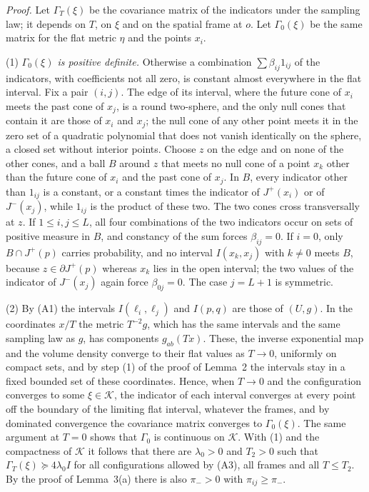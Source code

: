 \noindent\emph{Proof.} Let $\Gamma_T(\xi)$ be the covariance matrix of the
indicators under the sampling law; it depends on $T$, on $\xi$ and on the
spatial frame at $o$. Let $\Gamma_0(\xi)$ be the same matrix for the flat
metric $\eta$ and the points $x_i$.

(1) \emph{$\Gamma_0(\xi)$ is positive definite.} Otherwise a combination
$\sum\beta_{ij}1_{ij}$ of the indicators, with coefficients not all zero,
is constant almost everywhere in the flat interval. Fix a pair $(i,j)$. The
edge of its interval, where the future cone of $x_i$ meets the past cone of
$x_j$, is a round two-sphere, and the only null cones that contain it are
those of $x_i$ and $x_j$; the null cone of any other point meets it in the
zero set of a quadratic polynomial that does not vanish identically on the
sphere, a closed set without interior points. Choose $z$ on the edge and on
none of the other cones, and a ball $B$ around $z$ that meets no null cone
of a point $x_k$ other than the future cone of $x_i$ and the past cone of
$x_j$. In $B$, every indicator other than $1_{ij}$ is a constant, or a
constant times the indicator of $J^+(x_i)$ or of $J^-(x_j)$, while $1_{ij}$
is the product of these two. The two cones cross transversally at $z$. If
$1\le i,j\le L$, all four combinations of the two indicators occur on sets
of positive measure in $B$, and constancy of the sum forces
$\beta_{ij}=0$. If $i=0$, only $B\cap J^+(p)$ carries probability, and no
interval $I(x_k,x_j)$ with $k\neq0$ meets $B$, because
$z\in\partial J^+(p)$ whereas $x_k$ lies in the open interval; the two
values of the indicator of $J^-(x_j)$ again force $\beta_{0j}=0$. The
case $j=L+1$ is symmetric.

(2) By (A1) the intervals $I(\ell_i,\ell_j)$ and $I(p,q)$ are those of
$(U,g)$. In the coordinates $x/T$ the metric $T^{-2}g$, which has the same
intervals and the same sampling law as $g$, has components $g_{ab}(Tx)$.
These, the inverse exponential map and the volume density converge to their
flat values as $T\to0$, uniformly on compact sets, and by step (1) of the
proof of Lemma~2 the intervals stay in a fixed bounded set of these
coordinates. Hence, when $T\to0$ and the configuration converges to some
$\xi\in\mathcal K$, the indicator of each interval converges at every point
off the boundary of the limiting flat interval, whatever the frames, and by
dominated convergence the covariance matrix converges to $\Gamma_0(\xi)$.
The same argument at $T=0$ shows that $\Gamma_0$ is continuous on
$\mathcal K$. With (1) and the compactness of $\mathcal K$ it follows that
there are $\lambda_0>0$ and $T_2>0$ such that
$\Gamma_T(\xi)\succeq4\lambda_0I$ for all configurations allowed by (A3),
all frames and all $T\le T_2$. By the proof of Lemma~3(a) there is also
$\pi_->0$ with $\pi_{ij}\ge\pi_-$.

